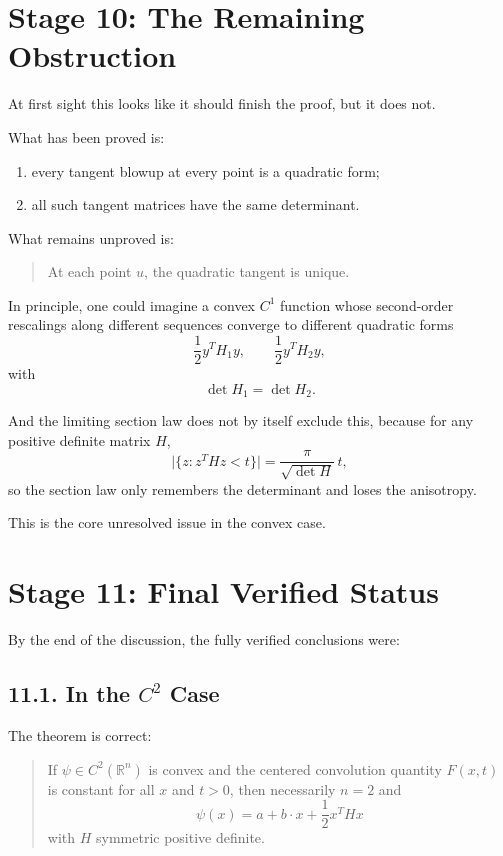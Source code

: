\documentclass[11pt]{article}
\begin{document}
\section*{Stage 10: The Remaining Obstruction}

At first sight this looks like it should finish the proof, but it does not.

What has been proved is:
\begin{enumerate}[label=\arabic*.]
\item every tangent blowup at every point is a quadratic form;
\item all such tangent matrices have the same determinant.
\end{enumerate}

What remains unproved is:
\begin{quote}
At each point $u$, the quadratic tangent is unique.
\end{quote}

In principle, one could imagine a convex $C^1$ function whose second-order rescalings along different sequences converge to different quadratic forms
\[
\frac12 y^T H_1 y,
\qquad
\frac12 y^T H_2 y,
\]
with
\[
\det H_1=\det H_2.
\]

And the limiting section law does not by itself exclude this, because for any positive definite matrix $H$,
\[
\bigl|\{z:z^THz<t\}\bigr|=\frac{\pi}{\sqrt{\det H}}\,t,
\]
so the section law only remembers the determinant and loses the anisotropy.

This is the core unresolved issue in the convex case.

\section*{Stage 11: Final Verified Status}

By the end of the discussion, the fully verified conclusions were:

\subsection*{11.1. In the $C^2$ Case}

The theorem is correct:
\begin{quote}
If $\psi\in C^2(\mathbb{R}^n)$ is convex and the centered convolution quantity $F(x,t)$ is constant for all $x$ and $t>0$, then necessarily $n=2$ and
\[
\psi(x)=a+b\cdot x+\frac12 x^THx
\]
with $H$ symmetric positive definite.
\end{quote}
\end{document}
